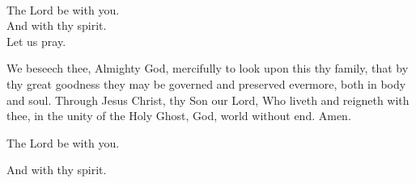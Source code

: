 \\
  \rubric{\Vbar}The Lord be with you.
\\
  \rubric{\Rbar}And with thy spirit.
\\
Let us pray.

We beseech thee, Almighty God, mercifully to look upon this thy family, that by thy great goodness they may be governed and preserved evermore, both in body and soul. Through Jesus Christ, thy Son our Lord, Who liveth and reigneth with thee, in the unity of the Holy Ghost, God, world without end.\rubric{\Rbar} Amen.

  \rubric{\Vbar}The Lord be with you.

  \rubric{\Rbar}And with thy spirit.
